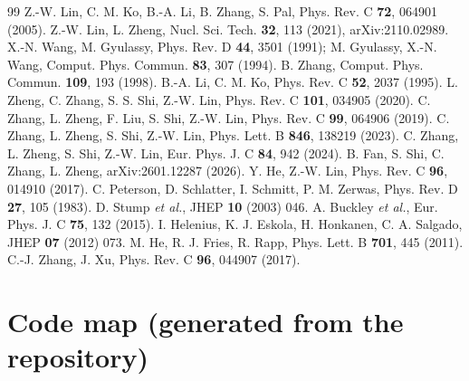 \documentclass[11pt,a4paper]{article}
\begin{document}
\begin{thebibliography}{99}\small
{} Z.-W. Lin, C. M. Ko, B.-A. Li, B. Zhang, S. Pal, Phys. Rev. C \textbf{72}, 064901 (2005).
 Z.-W. Lin, L. Zheng, Nucl. Sci. Tech. \textbf{32}, 113 (2021), arXiv:2110.02989.
 X.-N. Wang, M. Gyulassy, Phys. Rev. D \textbf{44}, 3501 (1991); M. Gyulassy, X.-N. Wang, Comput.
  Phys. Commun. \textbf{83}, 307 (1994).
 B. Zhang, Comput. Phys. Commun. \textbf{109}, 193 (1998).
 B.-A. Li, C. M. Ko, Phys. Rev. C \textbf{52}, 2037 (1995).
 L. Zheng, C. Zhang, S. S. Shi, Z.-W. Lin, Phys. Rev. C \textbf{101}, 034905 (2020).
 C. Zhang, L. Zheng, F. Liu, S. Shi, Z.-W. Lin, Phys. Rev. C \textbf{99}, 064906 (2019).
 C. Zhang, L. Zheng, S. Shi, Z.-W. Lin, Phys. Lett. B \textbf{846}, 138219 (2023).
 C. Zhang, L. Zheng, S. Shi, Z.-W. Lin, Eur. Phys. J. C \textbf{84}, 942 (2024).
 B. Fan, S. Shi, C. Zhang, L. Zheng, arXiv:2601.12287 (2026).
 Y. He, Z.-W. Lin, Phys. Rev. C \textbf{96}, 014910 (2017).
 C. Peterson, D. Schlatter, I. Schmitt, P. M. Zerwas, Phys. Rev. D \textbf{27}, 105 (1983).
 D. Stump \emph{et al.}, JHEP \textbf{10} (2003) 046.
 A. Buckley \emph{et al.}, Eur. Phys. J. C \textbf{75}, 132 (2015).
 I. Helenius, K. J. Eskola, H. Honkanen, C. A. Salgado, JHEP \textbf{07} (2012) 073.
 M. He, R. J. Fries, R. Rapp, Phys. Lett. B \textbf{701}, 445 (2011).
 C.-J. Zhang, J. Xu, Phys. Rev. C \textbf{96}, 044907 (2017).
\end{thebibliography}

\appendix
\section{Code map (generated from the repository)}

\end{document}
